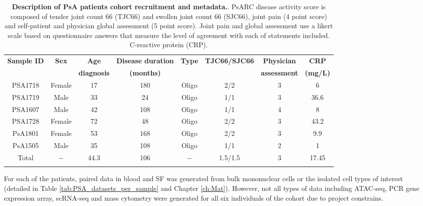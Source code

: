 %
\begin{landscape}
\begin{center}
\begin{longtable}[ht]{c c c c c c c c}
\caption[Description of PsA patients cohort recruitment and metadata.]{\textbf{Description of PsA patients cohort recruitment and metadata.}. PsARC disease activity score is composed of tender joint count 66 (TJC66) and swollen joint count 66 (SJC66), joint pain (4 point score) and self-patient and physician global assessment (5 point score). Joint pain and global assessment use a likert scale based on questionnaire answers that measure the level of agreement with each of statements included. C-reactive protein (CRP).}
\label{tab:PSA_cohort_metadata} \\
\toprule
\textbf{ Sample ID} & \textbf{Sex} & \textbf{Age} & \textbf{Disease duration} & \textbf{Type} &\textbf{TJC66/SJC66}  & \textbf{Physician } & \textbf{CRP} \\
& & \textbf{diagnosis} & \textbf{(months)} & &  & \textbf{assessment} & \textbf{(mg/L)} \\
\midrule
\midrule
PSA1718 & Female & 17 & 180 & Oligo  & 2/2 & 3 & 6 \\
PSA1719	& Male &	33 & 24	 & Oligo &	1/1 &	3 & 36.6 \\           
PSA1607 &	Male & 42 & 108 &	Oligo &	1/1	& 4 & 8 \\
PSA1728	& Female & 72	& 48 & Oligo & 2/2 & 3 & 43.2 \\
PsA1801	& Female & 53 & 168 & Oligo & 2/2 &	3 & 9.9 \\
PsA1505 & Male & 35 &	108 & Oligo & 1/1 & 2 & 1 \\	
\midrule
Total		& $-$	&	44.3 & 106 & $-$ & 1.5/1.5 & 3 & 17.45 \\																			
\bottomrule
\medskip
\end{longtable}
\end{center}
\end{landscape}


For each of the patients, paired data in blood and SF was generated from bulk mononuclear cells or the isolated cell types of interest (detailed in Table \ref{tab:PSA_datasets_per_sample} and Chapter \ref{ch:Mat}). However, not all types of data including ATAC-seq, PCR gene expression array, scRNA-seq and mass cytometry were generated for all six individuals of the cohort due to project constrains. 

